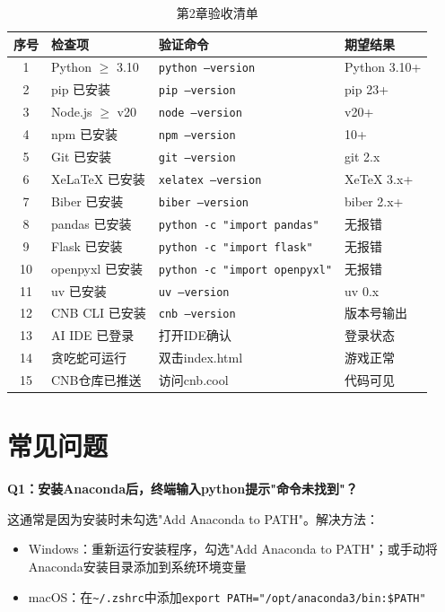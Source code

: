 \begin{table}[H]
\centering
\begin{tabular}{clll}
\toprule
\textbf{序号} & \textbf{检查项} & \textbf{验证命令} & \textbf{期望结果} \\
\midrule
1  & Python $\geq$ 3.10 & \texttt{python --version} & Python 3.10+ \\
2  & pip 已安装 & \texttt{pip --version} & pip 23+ \\
3  & Node.js $\geq$ v20 & \texttt{node --version} & v20+ \\
4  & npm 已安装 & \texttt{npm --version} & 10+ \\
5  & Git 已安装 & \texttt{git --version} & git 2.x \\
6  & XeLaTeX 已安装 & \texttt{xelatex --version} & XeTeX 3.x+ \\
7  & Biber 已安装 & \texttt{biber --version} & biber 2.x+ \\
8  & pandas 已安装 & \texttt{python -c "import pandas"} & 无报错 \\
9  & Flask 已安装 & \texttt{python -c "import flask"} & 无报错 \\
10 & openpyxl 已安装 & \texttt{python -c "import openpyxl"} & 无报错 \\
11 & uv 已安装 & \texttt{uv --version} & uv 0.x \\
12 & CNB CLI 已安装 & \texttt{cnb --version} & 版本号输出 \\
13 & AI IDE 已登录 & 打开IDE确认 & 登录状态 \\
14 & 贪吃蛇可运行 & 双击index.html & 游戏正常 \\
15 & CNB仓库已推送 & 访问cnb.cool & 代码可见 \\
\bottomrule
\end{tabular}
\caption{第2章验收清单}
\end{table}

\section{常见问题}

\textbf{Q1：安装Anaconda后，终端输入python提示"命令未找到"？}

这通常是因为安装时未勾选"Add Anaconda to PATH"。解决方法：
\begin{itemize}[leftmargin=2em]
  \item Windows：重新运行安装程序，勾选"Add Anaconda to PATH"；或手动将Anaconda安装目录添加到系统环境变量
  \item macOS：在\texttt{\textasciitilde/.zshrc}中添加\texttt{export PATH="/opt/anaconda3/bin:\$PATH"}
\end{itemize}

